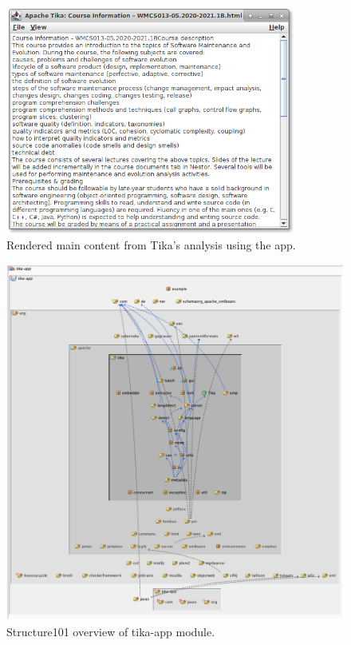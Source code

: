 \documentclass{article}
\begin{document}
\begin{figure}
    \centering
    \includegraphics[width=0.85\textwidth]{report/images/tika_app/maincontent.png}
    \caption{Rendered main content from Tika's analysis using the app.}
    \label{fig:tika_app/maincontent}
\end{figure}
\begin{figure}
    \centering
    \includegraphics[width=\textwidth]{report/images/tika_app/s101.png}
    \caption{Structure101 overview of tika-app module.}
    \label{fig:tika_app/s101}
\end{figure}
\end{document}

